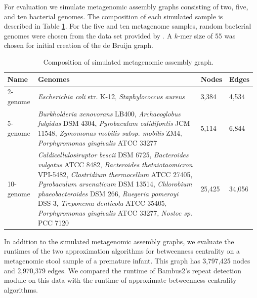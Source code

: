 \documentclass[runningheads,a4paper]{llncs}
\begin{document}
For evaluation we simulate metagenomic assembly graphs consisting of two, five, and ten bacterial genomes.
The composition of each simulated sample is described in Table \ref{tab:composition}.
For the five and ten metagenome samples, random bacterial genomes were chosen from the data set provided by \cite{shakya2013comparative}.
A $k$-mer size of 55 was chosen for initial creation of the de Bruijn graph.

\begin{table}[h]
\centering
\caption[]{Composition of simulated metagenomic assembly graph.}
\begin{tabularx}{\linewidth}{|l|X|l|l|}
\hline
\textbf{Name} & \textbf{Genomes} & \textbf{Nodes} & \textbf{Edges} \\
\hline
2-genome & \textit{Escherichia coli} str. K-12, \textit{Staphylococcus aureus}  & 3,384 & 4,534 \\
\hline
5-genome & \textit{Burkholderia xenovorans} LB400, \textit{Archaeoglobus fulgidus} DSM 4304,  \textit{Pyrobaculum calidifontis} JCM 11548, \textit{Zymomonas mobilis subsp. mobilis} ZM4, \textit{Porphyromonas gingivalis} ATCC 33277 & 5,114 & 6,844  \\
\hline
10-genome  & \textit{Caldicellulosiruptor bescii} DSM 6725, \textit{Bacteroides vulgatus} ATCC 8482,
\textit{Bacteroides thetaiotaomicron} VPI-5482, \textit{Clostridium thermocellum} ATCC 27405,
\textit{Pyrobaculum arsenaticum} DSM 13514, \textit{Chlorobium phaeobacteroides} DSM 266,
\textit{Ruegeria pomeroyi} DSS-3, \textit{Treponema denticola} ATCC 35405,
\textit{Porphyromonas gingivalis} ATCC 33277, \textit{Nostoc sp.} PCC 7120  & 25,425 & 34,056\\
\hline
\end{tabularx}
\label{tab:composition}
\end{table}

In addition to the simulated metagenomic assembly graphs, we evaluate the runtimes of the two approximation algorithms for betweenness centrality on a metagenomic stool sample of a premature infant\cite{morowitz2011strain}. This graph has 3,797,425 nodes and 2,970,379 edges. We compared the runtime of Bambus2's repeat detection module on this data with the runtime of approximate betweenness centrality algorithms.  
\end{document}
